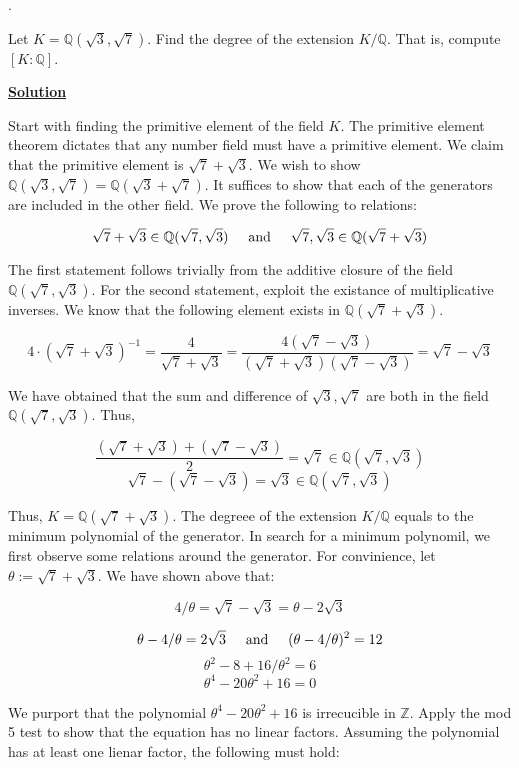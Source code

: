 \documentclass{article}
\newcommand{\new}[1]{
    \vspace{2mm}
    \noindent
    \textbf{
    \underline{#1}}
}
\def\ZZ{{\mathbb{Z}}}
\newcounter{problemcnt}
\newcommand{\Problem}{{
    \vspace{5mm}
    \stepcounter{problemcnt}
    \noindent
    \arabic{problemcnt}. 
}
}
\newcommand{\textAnd}{
    \hspace{5mm}
    \textrm{and}
    \hspace{5mm}
}
\newcommand{\<}{{{
    \langle
}}}
\def\ZZ{{\mathbb{Z}}}
\def\QQ{\mathbb{Q}}
\begin{document}
\Problem 
Let $K = \QQ(\sqrt{3}, \sqrt{7})$. Find the degree of the extension 
$K/\QQ$. That is, compute $[K:\QQ]$. 

\new{Solution} 
Start with finding the primitive element of the field $K$. The primitive 
element theorem dictates that any number field must have a primitive 
element. We claim that the primitive element is $\sqrt{7}+\sqrt{3}$. 
We wish to show $\QQ(\sqrt{3}, \sqrt{7}) = \QQ(\sqrt{3} + \sqrt{7})$. 
It suffices to show that each of the generators are included in 
the other field. We prove the following to relations:

\[
    \sqrt{7}+\sqrt{3} \in \QQ(\sqrt{7}, \sqrt{3})
    \textAnd 
    \sqrt{7}, \sqrt{3} \in \QQ(\sqrt{7}+\sqrt{3})
\]

The first statement follows trivially from the additive closure 
of the field $\QQ(\sqrt{7}, \sqrt{3})$. For the second statement, 
exploit the existance of multiplicative inverses. We know 
that the following element exists in $\QQ(\sqrt{7}+\sqrt{3})$. 

\[
    4\cdot(\sqrt{7}+\sqrt{3})^{-1}
    = \frac{4}{\sqrt{7}+\sqrt{3}}
    = \frac{4(\sqrt{7}-\sqrt{3})}{(\sqrt{7}+\sqrt{3}) (\sqrt{7}-\sqrt{3})}
    = \sqrt{7} - \sqrt{3}
\]

We have obtained that the sum and difference of $\sqrt{3}, \sqrt{7}$ 
are both in the field $\QQ(\sqrt{7}, \sqrt{3})$. Thus, 

\[
    \frac{(\sqrt{7} + \sqrt{3})+(\sqrt{7} - \sqrt{3})}{2} 
    = \sqrt{7}
    \in \QQ(\sqrt{7}, \sqrt{3})
\]
\[
    \sqrt{7} - (\sqrt{7} - \sqrt{3}) = \sqrt{3} \in \QQ(\sqrt{7}, \sqrt{3})
\]

\newcommand{\The}{{\theta}}

Thus, $K = \QQ(\sqrt{7}+ \sqrt{3})$. The degreee of the extension 
$K/\QQ$ equals to the minimum polynomial of the generator. In search 
for a minimum polynomil, we first observe some relations around 
the generator. 
For convinience, let $\The := \sqrt{7} + \sqrt{3}$. We have shown 
above that:

\[
    4/\The = \sqrt{7}-\sqrt{3} = \The - 2\sqrt{3}
\]

\[
    \The - 4/\The = 2\sqrt{3} 
    \textAnd 
    (\The - 4/\The)^2 = 12
\]
\[
    \The^2-8+16/\The^2 = 6
\]
\[
    \The^4 -20\The^2 + 16 = 0
\]

We purport that the polynomial $\The^4 -20\The^2 + 16 $ 
is irrecucible in $\ZZ$. Apply the mod 5 test to show that the 
equation has no linear factors. Assuming the polynomial has 
at least one lienar factor, the following must hold:
\end{document}
